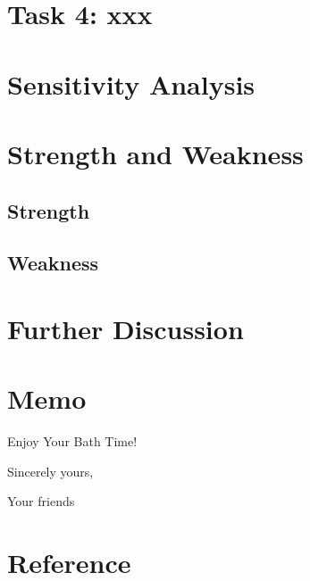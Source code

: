 \documentclass{mcmthesis}
\begin{document}
\section{Task 4: xxx}

\section{Sensitivity Analysis}

\section{Strength and Weakness}
\subsection{Strength}
\subsection{Weakness}

\section{Further Discussion}



\newpage
\section*{Memo} %

\begin{letter}{Enjoy Your Bath Time!}


\vspace{\parskip}

Sincerely yours,

Your friends

\end{letter}










\newpage
\section*{Reference} %
\printbibliography
\end{document}

